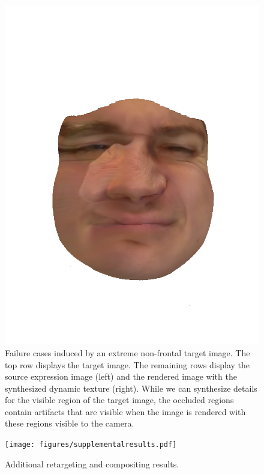 \documentclass[10pt,twocolumn,letterpaper]{article}
\begin{document}
\begin{figure}[th]
\begin{center}
  \includegraphics[width=0.32\columnwidth]{figures/haokyle_transfer/dynamic_000681.png}
\end{center}
   \caption{Failure cases induced by an extreme non-frontal target image. The top row displays the target image. The remaining rows display the source expression image (left) and the rendered image with the synthesized dynamic texture (right). While we can synthesize details for the visible region of the target image, the occluded regions contain artifacts that are visible when the image is rendered with these regions visible to the camera.}
   \vspace{-0.05in}
\label{replaceres2}
\end{figure}

\begin{figure}[th]
\begin{center}
  \texttt{[image: figures/supplementalresults.pdf]} \\
\end{center}
  \caption{Additional retargeting and compositing results.}
  \vspace{-0.05in}
\label{compositenew}
\end{figure}
\end{document}
